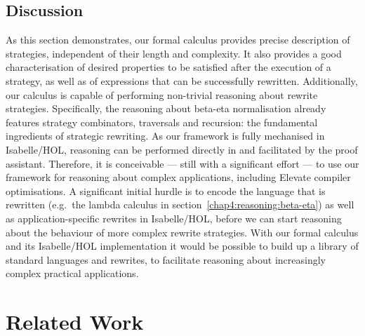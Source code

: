 \subsection{Discussion}
As this section demonstrates, our formal calculus provides precise description of strategies, independent of their length and complexity. It also provides a good characterisation of desired properties to be satisfied after the execution of a strategy, as well as of expressions that can be successfully rewritten. Additionally, our calculus is capable of performing non-trivial reasoning about rewrite strategies.
Specifically, the reasoning about beta-eta normalisation already features strategy combinators, traversals and recursion: the fundamental ingredients of strategic rewriting.
As our framework is fully mechanised in Isabelle/HOL, reasoning can be performed directly in and facilitated by the proof assistant.
Therefore, it is conceivable --- still with a significant effort --- to use our framework for reasoning about complex applications, including Elevate \citep{DBLP:journals/pacmpl/HagedornLKQGS20} compiler optimisations.
A significant initial hurdle is to encode the language that is rewritten (e.g.\ the lambda calculus in section~\ref{chap4:reasoning:beta-eta}) as well as application-specific rewrites in Isabelle/HOL, before we can start reasoning about the behaviour of more complex rewrite strategies.
With our formal calculus and its Isabelle/HOL implementation it would be possible to build up a library of standard languages and rewrites, to facilitate reasoning about increasingly complex practical applications.

\section{Related Work}
\label{related-work}
